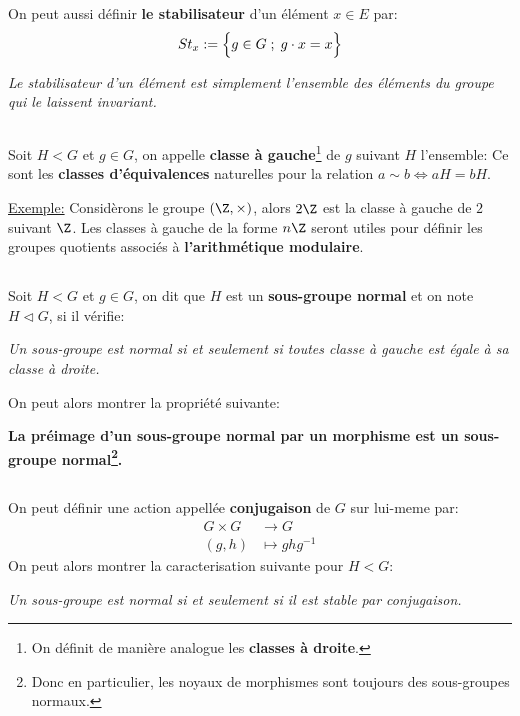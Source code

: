 \subsection*{}
On peut aussi définir \textbf{le stabilisateur} d'un élément \(x \in E\) par:
\[
   St_x := \Bigl\{ g \in G \; ; \; g \cdot x = x\Bigl\}   
\]
\begin{center}
   \textit{Le stabilisateur d'un élément est simplement l'ensemble des éléments du groupe qui le laissent invariant.}
\end{center}
\subsection*{}
Soit \(H < G\) et \(g \in G\), on appelle \textbf{classe à gauche}\footnote[1]{On définit de manière analogue les \textbf{classes à droite}.} de \(g\) suivant \(H\) l'ensemble:
Ce sont les \textbf{classes d'équivalences} naturelles pour la relation \(a \sim b \Longleftrightarrow aH = bH\).\<

\underline{Exemple:} Considèrons le groupe \((\Z, \times)\), alors \(2\Z\) est la classe à gauche de \(2\) suivant \(\Z\). Les classes à gauche de la forme \(n\Z\) seront utiles pour définir les groupes quotients associés à \textbf{l'arithmétique modulaire}.
\subsection*{}
Soit \(H < G\) et \(g \in G\), on dit que \(H\) est un \textbf{sous-groupe normal} et on note \(H \lhd G\), si il vérifie:
\begin{center}
   \textit{Un sous-groupe est normal si et seulement si toutes classe à gauche est égale à sa classe à droite.}
\end{center}
On peut alors montrer la propriété suivante:
\begin{center}
   \textbf{La préimage d'un sous-groupe normal par un morphisme est un sous-groupe normal\footnote[2]{Donc en particulier, les noyaux de morphismes sont toujours des sous-groupes normaux.}.}
\end{center}
\subsection*{}
On peut définir une action appellée \textbf{conjugaison} de \(G\) sur lui-meme par:
\[
   \begin{aligned}
      G \times G &\longrightarrow G\\
      (g, h) &\longmapsto ghg^{-1}
   \end{aligned}
\]
On peut alors montrer la caracterisation suivante pour \(H < G\):
\begin{center}
   \textit{Un sous-groupe est normal si et seulement si il est stable par conjugaison.}
\end{center}
